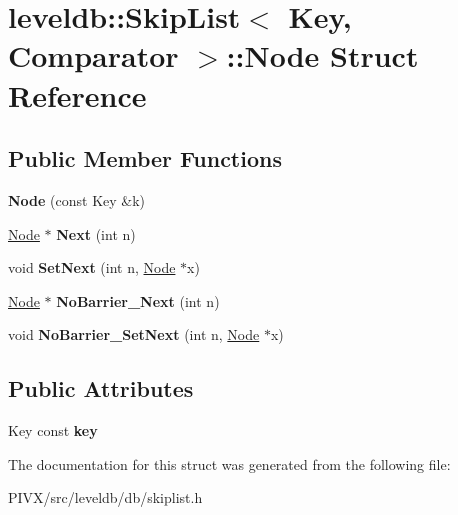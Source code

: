 \hypertarget{structleveldb_1_1_skip_list_1_1_node}{}\section{leveldb\+:\+:Skip\+List$<$ Key, Comparator $>$\+:\+:Node Struct Reference}
\label{structleveldb_1_1_skip_list_1_1_node}
\subsection*{Public Member Functions}
\begin{DoxyCompactItemize}
\item 
\mbox{\label{structleveldb_1_1_skip_list_1_1_node_a7dec52445f4f05892239a77407d109b0}} 
{\bfseries Node} (const Key \&k)
\item 
\mbox{\label{structleveldb_1_1_skip_list_1_1_node_aca7f18fc57f6c8e8a8dfe176eedbde74}} 
\mbox{\hyperlink{structleveldb_1_1_skip_list_1_1_node}{Node}} $\ast$ {\bfseries Next} (int n)
\item 
\mbox{\label{structleveldb_1_1_skip_list_1_1_node_a46c7cc10db3d77c85df7e411b720a8f4}} 
void {\bfseries Set\+Next} (int n, \mbox{\hyperlink{structleveldb_1_1_skip_list_1_1_node}{Node}} $\ast$x)
\item 
\mbox{\label{structleveldb_1_1_skip_list_1_1_node_a96b7213d1fd9ef893f3a7baecc5c4801}} 
\mbox{\hyperlink{structleveldb_1_1_skip_list_1_1_node}{Node}} $\ast$ {\bfseries No\+Barrier\+\_\+\+Next} (int n)
\item 
\mbox{\label{structleveldb_1_1_skip_list_1_1_node_af93b362f5e38fcf645820e02377cca64}} 
void {\bfseries No\+Barrier\+\_\+\+Set\+Next} (int n, \mbox{\hyperlink{structleveldb_1_1_skip_list_1_1_node}{Node}} $\ast$x)
\end{DoxyCompactItemize}
\subsection*{Public Attributes}
\begin{DoxyCompactItemize}
\item 
\mbox{\label{structleveldb_1_1_skip_list_1_1_node_a654f196e057edd294e4dbcbb6dabb844}} 
Key const {\bfseries key}
\end{DoxyCompactItemize}


The documentation for this struct was generated from the following file\+:\begin{DoxyCompactItemize}
\item 
P\+I\+V\+X/src/leveldb/db/skiplist.\+h\end{DoxyCompactItemize}
